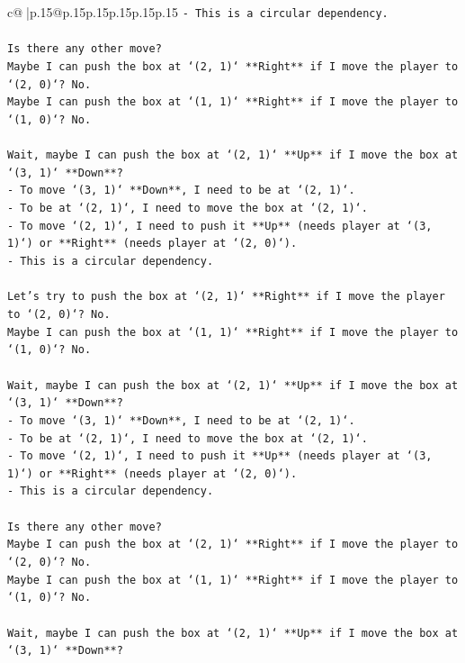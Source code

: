 \documentclass{article}
\begin{document}
{\begin{supertabular}{c@{$\;$}|p{.15\linewidth}@{}p{.15\linewidth}p{.15\linewidth}p{.15\linewidth}p{.15\linewidth}p{.15\linewidth}}
{{{\texttt{{-} This is a circular dependency.} \\
\\ 
\texttt{Is there any other move?} \\
\texttt{Maybe I can push the box at `(2, 1)` **Right** if I move the player to `(2, 0)`? No.} \\
\texttt{Maybe I can push the box at `(1, 1)` **Right** if I move the player to `(1, 0)`? No.} \\
\\ 
\texttt{Wait, maybe I can push the box at `(2, 1)` **Up** if I move the box at `(3, 1)` **Down**?} \\
\texttt{{-} To move `(3, 1)` **Down**, I need to be at `(2, 1)`.} \\
\texttt{{-} To be at `(2, 1)`, I need to move the box at `(2, 1)`.} \\
\texttt{{-} To move `(2, 1)`, I need to push it **Up** (needs player at `(3, 1)`) or **Right** (needs player at `(2, 0)`).} \\
\texttt{{-} This is a circular dependency.} \\
\\ 
\texttt{Let's try to push the box at `(2, 1)` **Right** if I move the player to `(2, 0)`? No.} \\
\texttt{Maybe I can push the box at `(1, 1)` **Right** if I move the player to `(1, 0)`? No.} \\
\\ 
\texttt{Wait, maybe I can push the box at `(2, 1)` **Up** if I move the box at `(3, 1)` **Down**?} \\
\texttt{{-} To move `(3, 1)` **Down**, I need to be at `(2, 1)`.} \\
\texttt{{-} To be at `(2, 1)`, I need to move the box at `(2, 1)`.} \\
\texttt{{-} To move `(2, 1)`, I need to push it **Up** (needs player at `(3, 1)`) or **Right** (needs player at `(2, 0)`).} \\
\texttt{{-} This is a circular dependency.} \\
\\ 
\texttt{Is there any other move?} \\
\texttt{Maybe I can push the box at `(2, 1)` **Right** if I move the player to `(2, 0)`? No.} \\
\texttt{Maybe I can push the box at `(1, 1)` **Right** if I move the player to `(1, 0)`? No.} \\
\\ 
\texttt{Wait, maybe I can push the box at `(2, 1)` **Up** if I move the box at `(3, 1)` **Down**?} \\
}}}
\end{supertabular}}
\end{document}
